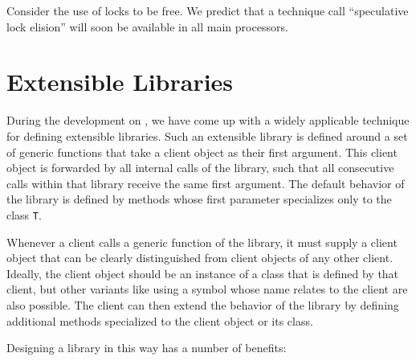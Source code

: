 Consider the use of locks to be free.  We predict that a technique
call ``speculative lock elision'' will soon be available in all main
processors.

\section{Extensible Libraries}

During the development on \sysname{}, we have come up with a
widely applicable technique for defining extensible libraries.  Such an
extensible library is defined around a set of generic functions that take a
client object as their first argument.  This client object is forwarded by
all internal calls of the library, such that all consecutive calls within
that library receive the same first argument.  The default behavior of the
library is defined by methods whose first parameter specializes only to the
class \texttt{T}.

Whenever a client calls a generic function of the library, it must supply a
client object that can be clearly distinguished from client objects of any
other client.  Ideally, the client object should be an instance of a class
that is defined by that client, but other variants like using a symbol
whose name relates to the client are also possible.  The client can then
extend the behavior of the library by defining additional methods
specialized to the client object or its class.

Designing a library in this way has a number of benefits:

